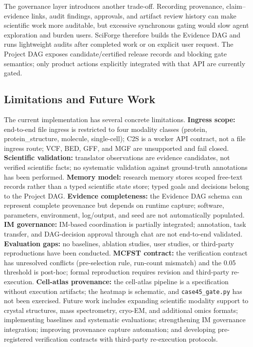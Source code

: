 \documentclass[sn-basic,Numbered,pdflatex]{sn-jnl}
\begin{document}
The governance layer introduces another trade-off. Recording provenance, claim--evidence links, audit findings, approvals, and artifact review history can make scientific work more auditable, but excessive synchronous gating would slow agent exploration and burden users. SciForge therefore builds the Evidence DAG and runs lightweight audits after completed work or on explicit user request. The Project DAG exposes candidate/certified release records and blocking gate semantics; only product actions explicitly integrated with that API are currently gated.

\subsection{Limitations and Future Work}

The current implementation has several concrete limitations. \textbf{Ingress scope:} end-to-end file ingress is restricted to four modality classes (protein, protein\_structure, molecule, single-cell); C2S is a worker API contract, not a file ingress route; VCF, BED, GFF, and MGF are unsupported and fail closed. \textbf{Scientific validation:} translator observations are evidence candidates, not verified scientific facts; no systematic validation against ground-truth annotations has been performed. \textbf{Memory model:} research memory stores scoped free-text records rather than a typed scientific state store; typed goals and decisions belong to the Project DAG. \textbf{Evidence completeness:} the Evidence DAG schema can represent complete provenance but depends on runtime capture; software, parameters, environment, log/output, and seed are not automatically populated. \textbf{IM governance:} IM-based coordination is partially integrated; annotation, task transfer, and DAG-decision approval through chat are not end-to-end validated. \textbf{Evaluation gaps:} no baselines, ablation studies, user studies, or third-party reproductions have been conducted. \textbf{MCFST contract:} the verification contract has unresolved conflicts (pre-selection rule, run-count mismatch) and the 0.05 threshold is post-hoc; formal reproduction requires revision and third-party re-execution. \textbf{Cell-atlas provenance:} the cell-atlas pipeline is a specification without execution artifacts; the heatmap is schematic, and \texttt{case45\_gate.py} has not been exercised. Future work includes expanding scientific modality support to crystal structures, mass spectrometry, cryo-EM, and additional omics formats; implementing baselines and systematic evaluations; strengthening IM governance integration; improving provenance capture automation; and developing pre-registered verification contracts with third-party re-execution protocols.
\end{document}
